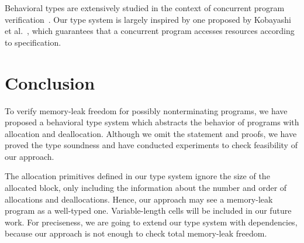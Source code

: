 \documentclass{sigplanconf}
\begin{document}
Behavioral types are extensively studied in the context of concurrent
program
verification~\cite{DBLP:conf/esop/HondaVK98,DBLP:journals/tcs/IgarashiK04,DBLP:conf/esop/VieiraCS08,DBLP:journals/lmcs/KobayashiSW06}.
Our type system is largely inspired by one proposed by Kobayashi et
al.~\cite{DBLP:journals/lmcs/KobayashiSW06}, which guarantees that a
concurrent program accesses resources according to specification.

\section{Conclusion}
To verify memory-leak freedom for possibly nonterminating programs, we
have proposed a behavioral type system which abstracts the behavior of
programs with allocation and deallocation. Although we omit the
statement and proofs, we have proved the type soundness and have
conducted experiments to check feasibility of our approach.

The allocation primitives defined in our type system ignore the size
of the allocated block, only including the information about the
number and order of allocations and deallocations.  Hence, our
approach may see a memory-leak program as a well-typed one.
Variable-length cells will be included in our future work. For
preciseness, we are going to extend our type system with dependencies,
because our approach is not enough to check total memory-leak freedom.


 
\end{document}
